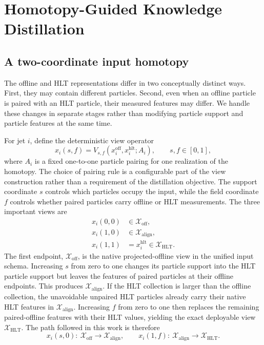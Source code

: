 \documentclass[11pt]{article}
\newcommand{\xoff}{\mathcal{X}_{\mathrm{off}}}
\newcommand{\xalign}{\mathcal{X}_{\mathrm{align}}}
\newcommand{\xhlt}{\mathcal{X}_{\mathrm{HLT}}}
\begin{document}
\section{Homotopy-Guided Knowledge Distillation}
\label{sec:method}

\subsection{A two-coordinate input homotopy}

The offline and HLT representations differ in two conceptually distinct
ways.  First, they may contain different particles.  Second, even when an
offline particle is paired with an HLT particle, their measured features may
differ.  We handle these changes in separate stages rather than modifying
particle support and particle features at the same time.

For jet $i$, define the deterministic view operator
\begin{equation}
    x_i(s,f)
      = V_{s,f}\!\left(x_i^{\mathrm{off}},x_i^{\mathrm{hlt}};A_i\right),
    \qquad s,f\in[0,1],
    \label{eq:view-operator}
\end{equation}
where $A_i$ is a fixed one-to-one particle pairing for one realization of the
homotopy.  The choice of pairing rule is a configurable part of the view
construction rather than a requirement of the distillation objective.  The
support coordinate $s$ controls which particles occupy the input, while the
field coordinate $f$ controls whether paired particles carry offline or HLT
measurements.  The three important views are
\begin{align}
    x_i(0,0) &\in \xoff, \\
    x_i(1,0) &\in \xalign, \\
    x_i(1,1) &= x_i^{\mathrm{hlt}}\in\xhlt.
    \label{eq:view-corners}
\end{align}
The first endpoint, $\xoff$, is the native projected-offline view in the
unified input schema.  Increasing $s$ from zero to one changes its particle
support into the HLT particle support but leaves the features of paired
particles at their offline endpoints.  This produces $\xalign$.  If the HLT
collection is larger than the offline collection, the unavoidable unpaired
HLT particles already carry their native HLT features in $\xalign$.
Increasing $f$ from zero to one then replaces the remaining paired-offline
features with their HLT values, yielding the exact deployable view $\xhlt$.
The path followed in this work is therefore
\begin{equation}
    x_i(s,0):\ \xoff\longrightarrow\xalign,
    \qquad
    x_i(1,f):\ \xalign\longrightarrow\xhlt.
    \label{eq:factorized-homotopy}
\end{equation}
\end{document}
